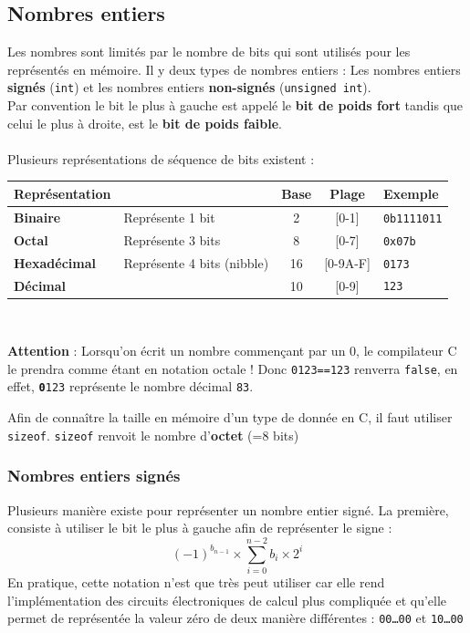 \subsection{Nombres entiers}
Les nombres sont limités par le nombre de bits qui sont utilisés pour les représentés en mémoire.
Il y deux types de nombres entiers : Les nombres entiers \textbf{signés} (\texttt{int}) et les nombres entiers \textbf{non-signés} (\texttt{unsigned int}).
\\
Par convention le bit le plus à gauche est appelé le \textbf{bit de poids fort} tandis que celui le plus à droite, est le \textbf{bit de poids faible}.
\\\\
Plusieurs représentations de séquence de bits existent : \\
\begin{tabular}{l||l|c|c|l}
  \textbf{Représentation} &  & \textbf{Base} & \textbf{Plage} & \textbf{Exemple} \\
  \hline \hline \textbf{Binaire} & Représente 1 bit & 2 & [0-1] & \texttt{0b1111011} \\
  \hline \textbf{Octal} & Représente 3 bits & 8 & [0-7] & \texttt{0x07b} \\
  \hline \textbf{Hexadécimal} & Représente 4 bits (nibble) & 16 & [0-9A-F] & \texttt{0173} \\
  \hline \textbf{Décimal} &  & 10 & [0-9] & \texttt{123} \\
  \hline
\end{tabular} \\
\begin{footnotesize}
  \textbf{Attention} : Lorsqu'on écrit un nombre commençant par un 0, le compilateur C le prendra comme étant en notation octale ! Donc \texttt{0123==123} renverra \texttt{false}, en effet, \texttt{\textbf{0}123} représente le nombre décimal \texttt{83}.

\end{footnotesize}
Afin de connaître la taille en mémoire d'un type de donnée en C, il faut utiliser \texttt{sizeof}.
\texttt{sizeof} renvoit le nombre d'\textbf{octet} (=8 bits)

\subsubsection{Nombres entiers signés}
Plusieurs manière existe pour représenter un nombre entier signé.
La première, consiste à utiliser le bit le plus à gauche afin de représenter le signe : $$ (-1)^{b_{n-1}} \times \sum_{i=0}^{n-2} b_i \times 2^i$$
En pratique, cette notation n'est que très peut utiliser car elle rend l'implémentation des circuits électroniques de calcul plus compliquée et qu'elle permet de représentée la valeur zéro de deux manière différentes : \texttt{00…00} et \texttt{10…00}

